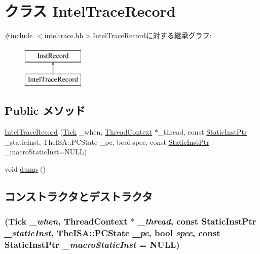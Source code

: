 \hypertarget{classTrace_1_1IntelTraceRecord}{
\section{クラス IntelTraceRecord}
\label{classTrace_1_1IntelTraceRecord}
}


{\ttfamily \#include $<$inteltrace.hh$>$}IntelTraceRecordに対する継承グラフ:\begin{figure}[H]
\begin{center}
\leavevmode
\includegraphics[height=2cm]{classTrace_1_1IntelTraceRecord}
\end{center}
\end{figure}
\subsection*{Public メソッド}
\begin{DoxyCompactItemize}
\item 
\hyperlink{classTrace_1_1IntelTraceRecord_af3f46954d4c97591e848661166e768e5}{IntelTraceRecord} (\hyperlink{base_2types_8hh_a5c8ed81b7d238c9083e1037ba6d61643}{Tick} \_\-when, \hyperlink{classThreadContext}{ThreadContext} $\ast$\_\-thread, const \hyperlink{classRefCountingPtr}{StaticInstPtr} \_\-staticInst, TheISA::PCState \_\-pc, bool spec, const \hyperlink{classRefCountingPtr}{StaticInstPtr} \_\-macroStaticInst=NULL)
\item 
void \hyperlink{classTrace_1_1IntelTraceRecord_accd2600060dbaee3a3b41aed4034c63c}{dump} ()
\end{DoxyCompactItemize}


\subsection{コンストラクタとデストラクタ}
\hypertarget{classTrace_1_1IntelTraceRecord_af3f46954d4c97591e848661166e768e5}{
\subsubsection[{IntelTraceRecord}]{ ({\bf Tick} {\em \_\-when}, \/  {\bf ThreadContext} $\ast$ {\em \_\-thread}, \/  const {\bf StaticInstPtr} {\em \_\-staticInst}, \/  TheISA::PCState {\em \_\-pc}, \/  bool {\em spec}, \/  const {\bf StaticInstPtr} {\em \_\-macroStaticInst} = {\ttfamily NULL})}}
\label{classTrace_1_1IntelTraceRecord_af3f46954d4c97591e848661166e768e5}




